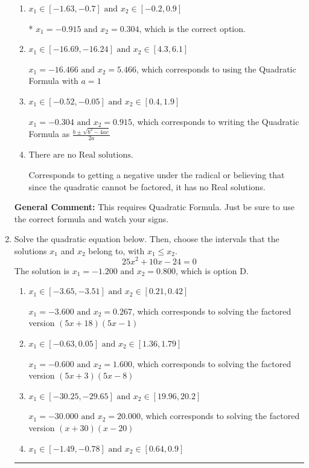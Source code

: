 \documentclass{extbook}[14pt]
\newcommand{\litem}[1]{\item #1

\rule{\textwidth}{0.4pt}}
\begin{document}
\begin{enumerate}
{\begin{enumerate}[label=\Alph*.]
 $x_1 = -22.237 \text{ and } x_2 = 21.626$, which corresponds to writing the Quadratic Formula as $-\frac{b}{2a} \pm \sqrt{b^2 - 4ac}$.
\item \( x_1 \in [-1.63, -0.7] \text{ and } x_2 \in [-0.2, 0.9] \)

* $x_1 = -0.915 \text{ and } x_2 = 0.304$, which is the correct option.
\item \( x_1 \in [-16.69, -16.24] \text{ and } x_2 \in [4.3, 6.1] \)

 $x_1 = -16.466 \text{ and } x_2 = 5.466$, which corresponds to using the Quadratic Formula with $a=1$
\item \( x_1 \in [-0.52, -0.05] \text{ and } x_2 \in [0.4, 1.9] \)

 $x_1 = -0.304 \text{ and } x_2 = 0.915$, which corresponds to writing the Quadratic Formula as $\frac{b \pm \sqrt{b^2 - 4ac}}{2a}$
\item \( \text{There are no Real solutions.} \)

Corresponds to getting a negative under the radical or believing that since the quadratic cannot be factored, it has no Real solutions.
\end{enumerate}

\textbf{General Comment:} This requires Quadratic Formula. Just be sure to use the correct formula and watch your signs.
}
\litem{
Solve the quadratic equation below. Then, choose the intervals that the solutions $x_1$ and $x_2$ belong to, with $x_1 \leq x_2$.
\[ 25x^{2} +10 x -24 = 0 \]The solution is \( x_1 = -1.200 \text{ and } x_2 = 0.800 \), which is option D.\begin{enumerate}[label=\Alph*.]
\item \( x_1 \in [-3.65, -3.51] \text{ and } x_2 \in [0.21, 0.42] \)

$x_1 = -3.600 \text{ and } x_2 = 0.267$, which corresponds to solving the factored version $(5x + 18)(5x -1)$
\item \( x_1 \in [-0.63, 0.05] \text{ and } x_2 \in [1.36, 1.79] \)

$x_1 = -0.600 \text{ and } x_2 = 1.600$, which corresponds to solving the factored version $(5x + 3)(5x -8)$
\item \( x_1 \in [-30.25, -29.65] \text{ and } x_2 \in [19.96, 20.2] \)

$x_1 = -30.000 \text{ and } x_2 = 20.000$, which corresponds to solving the factored version $(x + 30)(x -20)$
\item \( x_1 \in [-1.49, -0.78] \text{ and } x_2 \in [0.64, 0.9] \)


\end{enumerate}}
\end{enumerate}
\end{document}
